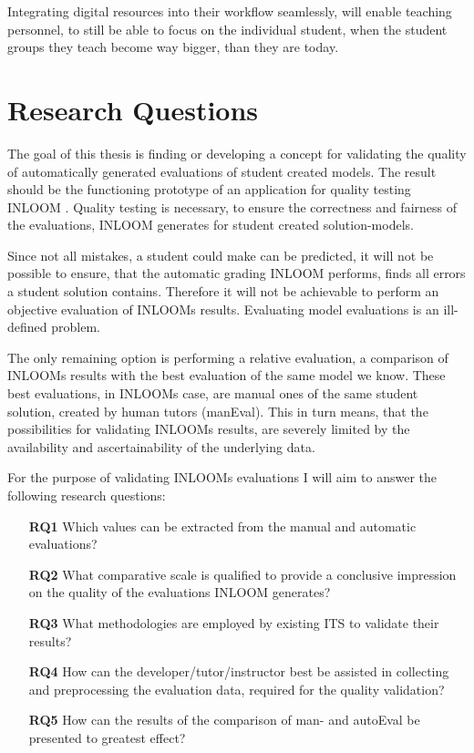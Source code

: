 Integrating digital resources into their workflow seamlessly, will enable teaching 
personnel, to still be able to focus on the individual student, when the student
groups they teach become way bigger, than they are today.

\section[Research Questions]{Research Questions}

The goal of this thesis is finding or developing a concept for validating the quality
of automatically generated evaluations of student created models. The result should be
the functioning prototype of an application for quality testing INLOOM \cite{1}. 
Quality testing is necessary, to ensure the correctness and fairness of the evaluations, INLOOM 
generates for student created solution-models. 

Since not all mistakes, a student could make can be predicted, it will not be possible to ensure, 
that the automatic grading INLOOM performs, finds all errors a student solution contains. 
Therefore it will not be achievable to perform an objective evaluation of INLOOMs results. 
Evaluating model evaluations is an ill-defined problem.

The only remaining option is performing a relative evaluation, a comparison of INLOOMs 
results with the best evaluation of the same model we know. These best evaluations, 
in INLOOMs case, are manual ones of the same student solution, created by human tutors 
(manEval). This in turn means, that the possibilities for validating INLOOMs results, 
are severely limited by the availability and ascertainability of the underlying data.

For the purpose of validating INLOOMs evaluations I will aim to answer the following
research questions:

\begin{itemize}
    \item[\textbf{RQ1}] Which values can be extracted from the manual and automatic evaluations?
    \item[\textbf{RQ2}] What comparative scale is qualified to provide a conclusive impression
    on the quality of the evaluations INLOOM generates? 
    \item[\textbf{RQ3}] What methodologies are employed by existing ITS to validate their results?
    \item[\textbf{RQ4}] How can the developer/tutor/instructor best be assisted in collecting
    and preprocessing the evaluation data, required for the quality validation? 
    \item[\textbf{RQ5}] How can the results of the comparison of man- and autoEval be presented
    to greatest effect? 
\end{itemize}

